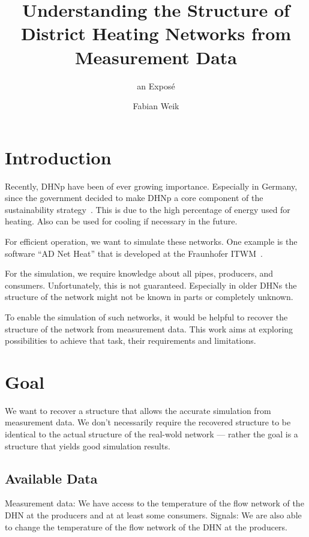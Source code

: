 \documentclass{scrartcl}
\title{Understanding the Structure of District Heating Networks from Measurement Data}
\subtitle{an Exposé}
\author{Fabian Weik}
\begin{document}
    \maketitle

    \section{Introduction}

    Recently, \ac{DHNp} have been of ever growing importance.
    Especially in Germany, since the government decided to make \ac{DHNp} a core component of the sustainability strategy~\cite{regierung2024heatingplanning}.
    This is due to the high percentage of energy used for heating.
    Also can be used for cooling if necessary in the future.

    For efficient operation, we want to simulate these networks.
    One example is the software ``AD Net Heat'' that is developed at the Fraunhofer ITWM~\cite{adnetheat}.

    For the simulation, we require knowledge about all pipes, producers, and consumers.
    Unfortunately, this is not guaranteed.
    Especially in older \acp{DHN} the structure of the network might not be known in parts or completely unknown.

    To enable the simulation of such networks, it would be helpful to recover the structure of the network from measurement data.
    This work aims at exploring possibilities to achieve that task, their requirements and limitations.

    \section{Goal}

    We want to recover a structure that allows the accurate simulation from measurement data.
    We don't necessarily require the recovered structure to be identical to the actual structure of the real-wold network --- rather  the goal is a structure that yields good simulation results.

    \subsection{Available Data}

    Measurement data: We have access to the temperature of the flow network of the \ac{DHN} at the producers and at at least some consumers.
    Signals: We are also able to change the temperature of the flow network of the \ac{DHN} at the producers.
\end{document}
